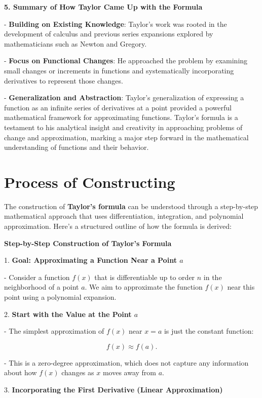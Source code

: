 \documentclass[a4paper,12pt]{book}
\begin{document}
\textbf{5. Summary of How Taylor Came Up with the Formula}

- \textbf{Building on Existing Knowledge}: Taylor’s work was rooted in the development of calculus and previous series expansions explored by mathematicians such as Newton and Gregory.

- \textbf{Focus on Functional Changes}: He approached the problem by examining small changes or increments in functions and systematically incorporating derivatives to represent those changes.

- \textbf{Generalization and Abstraction}: Taylor’s generalization of expressing a function as an infinite series of derivatives at a point provided a powerful mathematical framework for approximating functions.
Taylor’s formula is a testament to his analytical insight and creativity in approaching problems of change and approximation, marking a major step forward in the mathematical understanding of functions and their behavior.

\section{Process of Constructing}

The construction of \textbf{Taylor’s formula} can be understood through a step-by-step mathematical approach that uses differentiation, integration, and polynomial approximation. Here’s a structured outline of how the formula is derived:

\textbf{Step-by-Step Construction of Taylor's Formula}

1. \textbf{Goal: Approximating a Function Near a Point \( a \)}

- Consider a function \( f(x) \) that is differentiable up to order \( n \) in the neighborhood of a point \( a \). We aim to approximate the function \( f(x) \) near this point using a polynomial expansion.

2. \textbf{Start with the Value at the Point \( a \)}

- The simplest approximation of \( f(x) \) near \( x = a \) is just the constant function:

     \[
     f(x) \approx f(a).
     \]
     
- This is a zero-degree approximation, which does not capture any information about how \( f(x) \) changes as \( x \) moves away from \( a \).

3. \textbf{Incorporating the First Derivative (Linear Approximation)}
\end{document}
